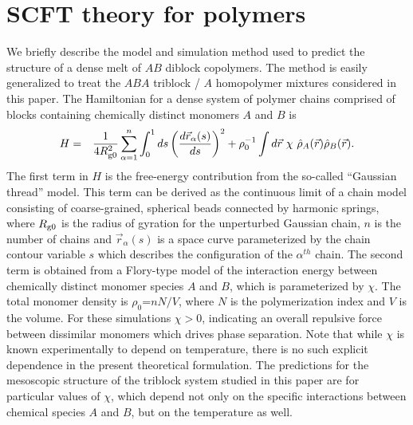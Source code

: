 \documentclass[onecolumn,amsmath,amssymb,floatfix]{elsart}
\begin{document}
\section{SCFT theory for polymers}
\label{sec_theory}


We briefly describe the model and simulation method used to predict
the structure of a dense melt of $AB$ diblock copolymers.
The method is easily generalized to
treat the $ABA$ triblock / $A$ homopolymer mixtures considered in
this paper.
The Hamiltonian for a dense system of polymer chains
comprised of blocks containing chemically distinct monomers $A$ and $B$ is
%
 \begin{eqnarray}
 H
 & = &
  \frac{1}{4 R_{{\rm g}0}^2 } \sum^{n}_{\alpha = 1}
           \int_0^1 ds \left ( \frac{ d {\vec r}_{\alpha}(s)}{ds} \right )^{2} +
           \rho_0^{-1} \int d{\vec r} \ \chi \ {\hat \rho_A}({\vec r}) {\hat \rho_B}({\vec r}) .
 \end{eqnarray}
%
The first term in $H$ is the free-energy contribution from
the so-called ``Gaussian thread'' \cite{doi_book} model.
This term can be
derived as the continuous limit of a chain model consisting of
coarse-grained, spherical beads connected by harmonic springs,
where $R_{{\rm g}0}$ is the radius of gyration for the unperturbed
Gaussian chain, $n$ is the number of chains and ${\vec
r}_{\alpha}(s)$ is a space curve parameterized by the chain
contour variable $s$ which describes the configuration of the
$\alpha^{th}$ chain. The second term is obtained from a Flory-type
model of the interaction energy between chemically distinct
monomer species $A$ and $B$, which is parameterized by $\chi$. The
total monomer density is $\rho_0$=$n N/V$, where $N$ is the
polymerization index and $V$ is the volume. For these simulations
$\chi > 0$, indicating an overall repulsive force between
dissimilar monomers which drives phase separation. Note that while
$\chi$ is known experimentally to depend on temperature, there is
no such explicit dependence in the present theoretical
formulation. The predictions for the mesoscopic structure of the
triblock system studied in this paper are for particular values of
$\chi$, which depend not only on the specific interactions between
chemical species $A$ and $B$, but on the temperature as well.
\end{document}
